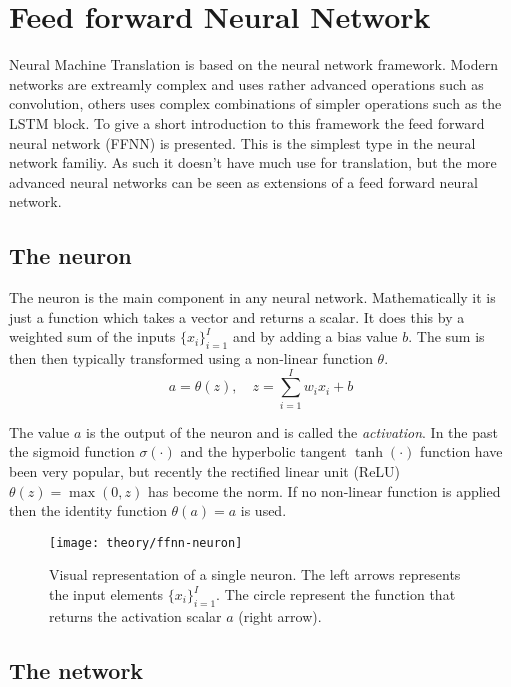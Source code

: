 \section{Feed forward Neural Network}
\label{sec:theory:ffnn}

Neural Machine Translation is based on the neural network framework. Modern networks are extreamly complex and uses rather advanced operations such as convolution, others uses complex combinations of simpler operations such as the LSTM block. To give a short introduction to this framework the feed forward neural network (FFNN) is presented. This is the simplest type in the neural network familiy. As such it doesn't have much use for translation, but the more advanced neural networks can be seen as extensions of a feed forward neural network.

\subsection{The neuron}

The neuron is the main component in any neural network. Mathematically it is just a function which takes a vector and returns a scalar. It does this by a weighted sum of the inputs $\{ x_i \}_{i=1}^I$ and by adding a bias value $b$. The sum is then then typically transformed using a non-linear function $\theta$.
\begin{equation}
a = \theta(z),\quad z = \sum_{i=1}^I w_{i} x_i + b
\end{equation}

The value $a$ is the output of the neuron and is called the \textit{activation}. In the past the sigmoid function $\sigma(\cdot)$ and the hyperbolic tangent $\tanh(\cdot)$ function have been very popular\cite{bishop}, but recently the rectified linear unit (ReLU) $\theta(z) = \max(0, z)$ has become the norm. If no non-linear function is applied then the identity function $\theta(a) = a$ is used.

\begin{figure}[H]
	\centering
	\texttt{[image: theory/ffnn-neuron]}
	\caption{Visual representation of a single neuron. The left arrows represents the input elements $\{ x_i \}_{i=1}^I$. The circle represent the function that returns the activation scalar $a$ (right arrow).}
\end{figure}

\subsection{The network}

